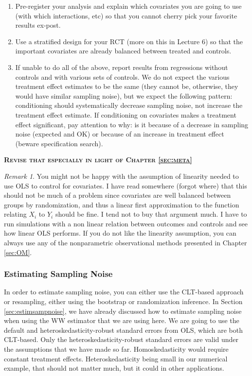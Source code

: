 \documentclass[
]{book}
\providecommand{\tightlist}{%
  \setlength{\itemsep}{0pt}\setlength{\parskip}{0pt}}
\theoremstyle{definition}
\theoremstyle{definition}
\theoremstyle{definition}
\theoremstyle{definition}
\theoremstyle{remark}
\newtheorem*{remark}{Remark}
\begin{document}
\begin{enumerate}
\def\labelenumi{\arabic{enumi}.}
\tightlist
\item
  Pre-register your analysis and explain which covariates you are going to use (with which interactions, etc) so that you cannot cherry pick your favorite results ex-post.
\item
  Use a stratified design for your RCT (more on this in Lecture 6) so that the important covariates are already balanced between treated and controls.
\item
  If unable to do all of the above, report results from regressions without controls and with various sets of controls.
  We do not expect the various treatment effect estimates to be the same (they cannot be, otherwise, they would have similar sampling noise), but we expect the following pattern: conditioning should systematically decrease sampling noise, not increase the treatment effect estimate.
  If conditioning on covariates makes a treatment effect significant, pay attention to why: is it because of a decrease in sampling noise (expected and OK) or because of an increase in treatment effect (beware specification search).
\end{enumerate}

\textbf{\textsc{Revise that especially in light of Chapter \ref{sec:meta}}}

\begin{remark}
\iffalse{} {Remark. } \fi{}You might not be happy with the assumption of linearity needed to use OLS to control for covariates.
I have read somewhere (forgot where) that this should not be much of a problem since covariates are well balanced between groups by randomization, and thus a linear first approximation to the function relating \(X_i\) to \(Y_i\) should be fine.
I tend not to buy that argument much.
I have to run simulations with a non linear relation between outcomes and controls and see how linear OLS performs.
If you do not like the linearity assumption, you can always use any of the nonparametric observational methods presented in Chapter \ref{sec:OM}.
\end{remark}

\hypertarget{estimating-sampling-noise}{%
\subsubsection{Estimating Sampling Noise}\label{estimating-sampling-noise}}

In order to estimate sampling noise, you can either use the CLT-based approach or resampling, either using the bootstrap or randomization inference.
In Section \ref{sec:estimsampnoise}, we have already discussed how to estimate sampling noise when using the WW estimator that we are using here.
We are going to use the default and heteroskedasticity-robust standard errors from OLS, which are both CLT-based.
Only the heteroskedasticity-robust standard errors are valid under the assumptions that we have made so far.
Homoskedasticity would require constant treatment effects.
Heteroskedasticity being small in our numerical example, that should not matter much, but it could in other applications.
\end{document}

